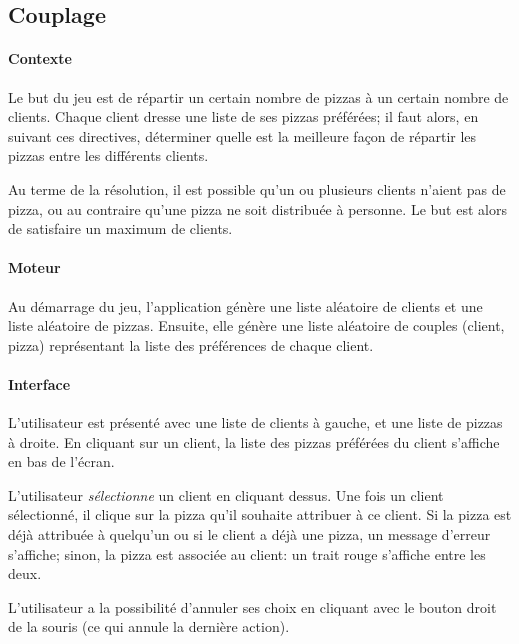 	\subsection{Couplage}
		\paragraph{Contexte}
			Le but du jeu est de répartir un certain nombre de pizzas à un certain nombre de
			 clients. Chaque client dresse une liste de ses pizzas préférées; il faut alors,
			 en suivant ces directives, déterminer quelle est la meilleure façon de répartir
			 les pizzas entre les différents clients.

			Au terme de la résolution, il est possible qu'un ou plusieurs clients n'aient pas
			 de pizza, ou au contraire qu'une pizza ne soit distribuée à personne. Le but est
			 alors de satisfaire un maximum de clients.
		\paragraph{Moteur}
			Au démarrage du jeu, l'application génère une liste aléatoire de clients et une
			 liste aléatoire de pizzas. Ensuite, elle génère une liste aléatoire de couples
			 (client, pizza) représentant la liste des préférences de chaque client.
		\paragraph{Interface}
			L'utilisateur est présenté avec une liste de clients à gauche, et une liste
			 de pizzas à droite. En cliquant sur un client, la liste des pizzas préférées
			 du client s'affiche en bas de l'écran.

			L'utilisateur \emph{sélectionne} un client en cliquant dessus. Une fois un client
			 sélectionné, il clique sur la pizza qu'il souhaite attribuer à ce client. Si la
			 pizza est déjà attribuée à quelqu'un ou si le client a déjà une pizza, un message
			 d'erreur s'affiche; sinon, la pizza est associée au client: un trait rouge
			 s'affiche entre les deux.

			L'utilisateur a la possibilité d'annuler ses choix en cliquant avec le bouton
			 droit de la souris (ce qui annule la dernière action).
